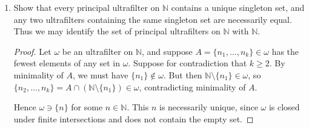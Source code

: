 \documentclass[a4paper,10pt]{report}
\newcommand{\N}{\mathbb{N}}
\begin{document}
\begin{enumerate}
\begin{enumerate}
\begin{proof}
					Let $x \in \bigcap_{K \in \mathscr{C}}{K}$.
					Let $U$ be an open neighborhood of $x$.
					We want to show $f^{-1}(U) \in \omega$.
					Note that $X \setminus U$ is closed and $x \notin X \setminus U$.
					Hence $X \setminus U \notin \mathscr{C}$ by the construction of $x$.
					But $f^{-1}(X \setminus U) = \N \setminus f^{-1}(U)$.
					Since $\omega$ is an ultrafilter, it follows that $f^{-1}(U) \in \omega$.
					
					Finally, we claim that $x$ is the unique limit of $f$ along $\omega$.
					Indeed, since $X$ is Hausdorff, given any other point $y \in X$,
					we may find disjoint open neighborhoods $U \ni x$ and $V \ni y$ so that
					$f^{-1}(V) \subseteq f^{-1}(X \setminus U) = \N \setminus f^{-1}(U) \notin \omega$.
				\end{proof}
			\item Show that every principal ultrafilter on $\N$ contains a unique singleton set,
				and any two ultrafilters containing the same singleton set are necessarily equal.
				Thus we may identify the set of principal ultrafilters on $\N$ with $\N$.
				\begin{proof}
					Let $\omega$ be an ultrafilter on $\N$,
					and suppose $A = \{n_1, \dots, n_k\} \in \omega$ has the fewest elements
					of any set in $\omega$.
					Suppose for contradiction that $k \ge 2$.
					By minimality of $A$, we must have $\{n_1\} \notin \omega$.
					But then $\N \setminus \{n_1\} \in \omega$, so
					$\{n_2, \dots, n_k\} = A \cap (\N \setminus \{n_1\}) \in \omega$,
					contradicting minimality of $A$.
					
					Hence $\omega \ni \{n\}$ for some $n \in \N$.
					This $n$ is necessarily unique, since $\omega$ is
					closed under finite intersections and does not contain the empty set.
					

\end{proof}
\end{enumerate}
\end{enumerate}
\end{document}
